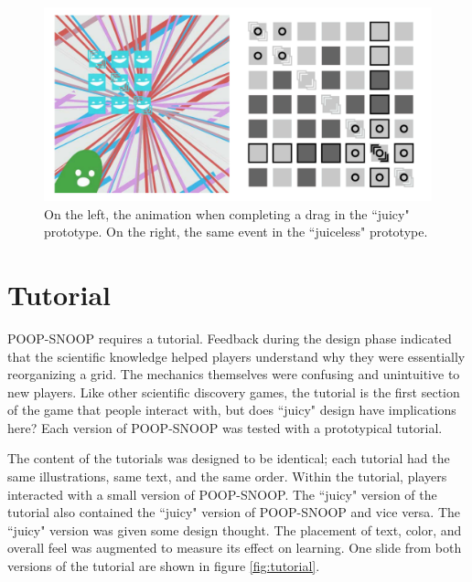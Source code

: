 \begin{figure}
\begin{center}
\includegraphics[width=150mm]{images/background.pdf}
\caption[Differences between animations in each prototype]{On the left, the animation when completing a drag in the ``juicy" prototype. On the right, the same event in the ``juiceless" prototype.}
\label{fig:background}
\end{center}
\end{figure}

\section{Tutorial}

POOP-SNOOP requires a tutorial. Feedback during the design phase indicated that the scientific knowledge helped players understand why they were essentially reorganizing a grid. The mechanics themselves were confusing and unintuitive to new players. Like other scientific discovery games, the tutorial is the first section of the game that people interact with, but does ``juicy" design have implications here? Each version of POOP-SNOOP was tested with a prototypical tutorial.

The content of the tutorials was designed to be identical; each tutorial had the same illustrations, same text, and the same order. Within the tutorial, players interacted with a small version of POOP-SNOOP. The ``juicy" version of the tutorial also contained the ``juicy" version of POOP-SNOOP and vice versa. The ``juicy" version was given some design thought. The placement of text, color, and overall feel was augmented to measure its effect on learning. One slide from both versions of the tutorial are shown in figure \ref{fig:tutorial}.

